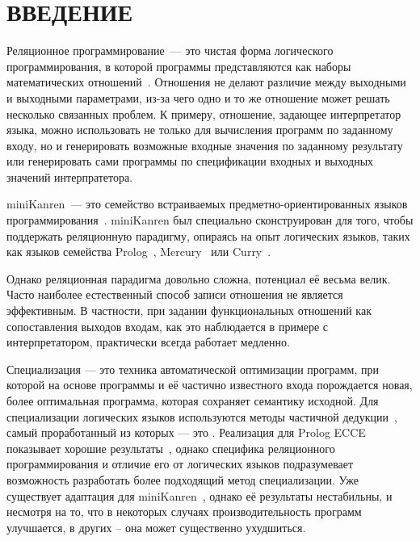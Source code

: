 \section*{ВВЕДЕНИЕ}


Реляционное программирование~--- это чистая форма логического программирования,
в которой программы представляются как наборы математических отношений~\cite{byrdMK}.
Отношения
не делают различие между выходными и выходными параметрами, из-за чего одно и то же
отношение может решать несколько связанных проблем. К примеру, отношение, задающее
интерпретатор языка, можно использовать не только для вычисления программ по
заданному входу, но и генерировать возможные входные значения по заданному результату
или генерировать сами программы по спецификации входных и выходных значений интерпратетора.

miniKanren~--- это семейство встраиваемых предметно-ориентированных языков программирования~\cite{byrdMK}.
miniKanren был специально сконструирован для того, чтобы поддержать реляционную парадигму,
опираясь на опыт логических языков, таких как языков семейства Prolog~\cite{logicMJ},
Mercury~\cite{mercury} или Curry~\cite{curry}.

Однако реляционная парадигма довольно сложна, потенциал её весьма велик.
Часто наиболее естественный способ записи отношения не является эффективным. В
частности, при задании функциональных отношений как сопоставления выходов
входам, как это наблюдается в примере с интерпретатором, практически
всегда работает медленно.

Специализация --- это техника автоматической оптимизации программ,
при которой на основе программы и её частично известного входа
порождается новая, более оптимальная программа, которая сохраняет семантику
исходной. Для специализации логических языков используются методы частичной дедукции~\cite{advanced},
самый проработанный из которых --- это \cpd\cite{cpd}. Реализация \forcpd для Prolog ECCE показывает
хорошие результаты~\cite{controlPoly}, однако специфика реляционного программирования
и отличие его от логических языков подразумевает возможность разработать более подходящий
метод специализации. Уже существует адаптация \forcpd для miniKanren~\cite{lozov},
однако её результаты нестабильны, и несмотря на то, что в некоторых случаях
производительность программ улучшается, в других -- она может существенно ухудшиться.

